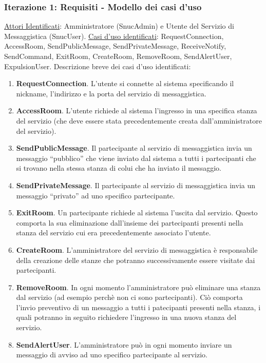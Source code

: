 \begin{frame} [allowframebreaks]
  \frametitle{Iterazione 1: Requisiti - Modello dei casi d'uso}
   \underline{Attori Identificati}: Amministratore (SnucAdmin) e Utente del Servizio di Messaggistica (SnucUser). \newline
   \underline{Casi d'uso identificati}: RequestConnection, AccessRoom, SendPublicMessage, SendPrivateMessage, ReceiveNotify, SendCommand, ExitRoom, CreateRoom, 
                                        RemoveRoom, SendAlertUser, ExpulsionUser. \newline
   Descrizione breve dei casi d'uso identificati:
   \begin{enumerate} 
    \item \textbf{RequestConnection}. L’utente si connette al sistema specificando il nickname, l’indirizzo e la porta del servizio di messaggistica.
    \item \textbf{AccessRoom}. L’utente richiede al sistema l’ingresso in una specifica stanza del servizio (che deve essere stata precedentemente creata 
          dall’amministratore del servizio). 
    \item \textbf{SendPublicMessage}. Il partecipante al servizio di messaggistica invia un messaggio ``pubblico'' che viene inviato dal sistema a tutti i 
          partecipanti che si trovano nella stessa stanza di colui che ha inviato il messaggio.
    \item \textbf{SendPrivateMessage}. Il partecipante al servizio di messaggistica  invia un messaggio ``privato'' ad uno specifico partecipante.
    \item \textbf{ExitRoom}. Un partecipante richiede al sistema l’uscita dal servizio. Questo comporta la sua eliminazione dall’insieme dei partecipanti presenti 
          nella stanza del servizio cui era precedentemente associato l’utente.
    \item \textbf{CreateRoom}. L’amministratore del servizio di messaggistica è responsabile della creazione delle stanze che potranno successivamente 
          essere visitate dai partecipanti.
    \item \textbf{RemoveRoom}. In ogni momento l’amministratore può eliminare una stanza dal servizio (ad esempio perchè non ci sono partecipanti). Ciò comporta 
          l’invio preventivo di un messaggio a tutti i patecipanti presenti nella stanza, i quali potranno in seguito richiedere l’ingresso in una   
          nuova stanza del servizio.
    \item \textbf{SendAlertUser}. L’amministratore può in ogni momento inviare un messaggio di avviso ad uno specifico partecipante al servizio.

\end{enumerate}
\end{frame}
